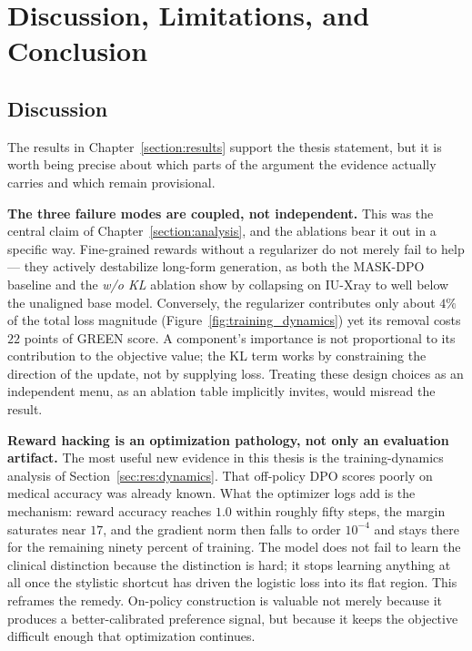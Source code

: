\section{Discussion, Limitations, and Conclusion}
\label{section:conclusion}

\subsection{Discussion}
\label{sec:con:discussion}

The results in Chapter~\ref{section:results} support the thesis statement, but it is worth being precise about which parts of the argument the evidence actually carries and which remain provisional.

\textbf{The three failure modes are coupled, not independent.} This was the central claim of Chapter~\ref{section:analysis}, and the ablations bear it out in a specific way. Fine-grained rewards without a regularizer do not merely fail to help --- they actively destabilize long-form generation, as both the MASK-DPO baseline and the \emph{w/o KL} ablation show by collapsing on IU-Xray to well below the unaligned base model. Conversely, the regularizer contributes only about $4\%$ of the total loss magnitude (Figure~\ref{fig:training_dynamics}) yet its removal costs $22$ points of GREEN score. A component's importance is not proportional to its contribution to the objective value; the KL term works by constraining the direction of the update, not by supplying loss. Treating these design choices as an independent menu, as an ablation table implicitly invites, would misread the result.

\textbf{Reward hacking is an optimization pathology, not only an evaluation artifact.} The most useful new evidence in this thesis is the training-dynamics analysis of Section~\ref{sec:res:dynamics}. That off-policy DPO scores poorly on medical accuracy was already known. What the optimizer logs add is the mechanism: reward accuracy reaches $1.0$ within roughly fifty steps, the margin saturates near $17$, and the gradient norm then falls to order $10^{-4}$ and stays there for the remaining ninety percent of training. The model does not fail to learn the clinical distinction because the distinction is hard; it stops learning anything at all once the stylistic shortcut has driven the logistic loss into its flat region. This reframes the remedy. On-policy construction is valuable not merely because it produces a better-calibrated preference signal, but because it keeps the objective difficult enough that optimization continues.

